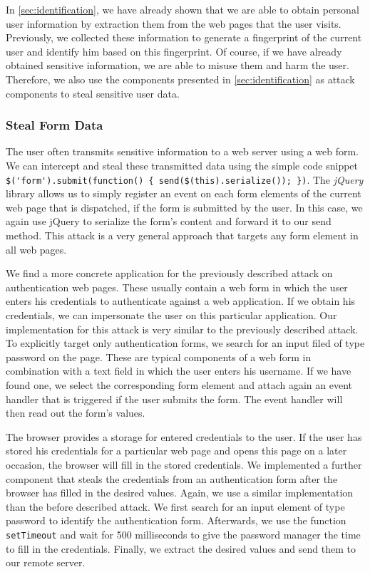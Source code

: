 	In \autoref{sec:identification}, we have already shown that we are able to obtain personal user information by extraction them from the web pages that the user visits. Previously, we collected these information to generate a fingerprint of the current user and identify him based on this fingerprint. Of course, if we have already obtained sensitive information, we are able to misuse them and harm the user. Therefore, we also use the components presented in \autoref{sec:identification} as attack components to steal sensitive user data.

\subsubsection{Steal Form Data}
\label{sec:stealFormData}

	The user often transmits sensitive information to a web server using a web form. We can intercept and steal these transmitted data using the simple code snippet \lstinline|$('form').submit(function() { send($(this).serialize()); })|. The \textit{jQuery} library allows us to simply register an event on each form elements of the current web page that is dispatched, if the form is submitted by the user. In this case, we again use jQuery to serialize the form's content and forward it to our send method. This attack is a very general approach that targets any form element in all web pages.
	
	We find a more concrete application for the previously described attack on authentication web pages. These usually contain a web form in which the user enters his credentials to authenticate against a web application. If we obtain his credentials, we can impersonate the user on this particular application. Our implementation for this attack is very similar to the previously described attack. To explicitly target only authentication forms, we search for an input filed of type password on the page. These are typical components of a web form in combination with a text field in which the user enters his username. If we have found one, we select the corresponding form element and attach again an event handler that is triggered if the user submits the form. The event handler will then read out the form's values.

	The browser provides a storage for entered credentials to the user. If the user has stored his credentials for a particular web page and opens this page on a later occasion, the browser will fill in the stored credentials. We implemented a further component that steals the credentials from an authentication form after the browser has filled in the desired values. Again, we use a similar implementation than the before described attack. We first search for an input element of type password to identify the authentication form. Afterwards, we use the function \texttt{setTimeout} and wait for 500 milliseconds to give the password manager the time to fill in the credentials. Finally, we extract the desired values and send them to our remote server.
		
